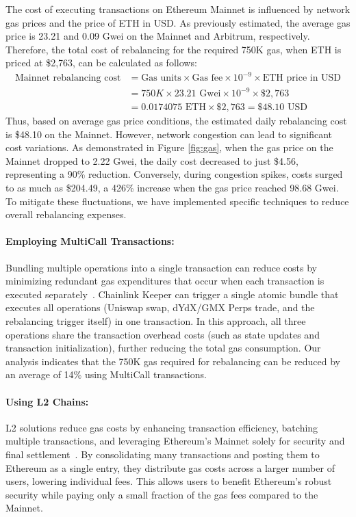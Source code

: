 The cost of executing transactions on Ethereum Mainnet is influenced by network gas prices and the price of ETH in USD. As previously estimated, the average gas price is 23.21 and 0.09 Gwei on the Mainnet and Arbitrum, respectively. Therefore, the total cost of rebalancing for the required 750K gas, when ETH is priced at \$2,763, can be calculated as follows:
\begin{equation*}\label{eq:cost}
	\begin{aligned}
		\text{Mainnet rebalancing cost} & = \text{Gas units} \times \text{Gas fee} \times 10^{-9} \times \text{ETH price in USD} \\
		& = 750K \times 23.21 \text{ Gwei} \times 10^{-9} \times \$2,763 \\
		& = 0.0174075 \text{ ETH} \times \$2,763 = \$48.10 \text{ USD}		
	\end{aligned}
\end{equation*}
Thus, based on average gas price conditions, the estimated daily rebalancing cost is \$48.10 on the Mainnet. However, network congestion can lead to significant cost variations. As demonstrated in Figure \ref{fig:gas}, when the gas price on the Mainnet dropped to 2.22 Gwei, the daily cost decreased to just \$4.56, representing a 90\% reduction. Conversely, during congestion spikes, costs surged to as much as \$204.49, a 426\% increase when the gas price reached 98.68 Gwei. To mitigate these fluctuations, we have implemented specific techniques to reduce overall rebalancing expenses.

\paragraph{Employing MultiCall Transactions:} 
Bundling multiple operations into a single transaction can reduce costs by minimizing redundant gas expenditures that occur when each transaction is executed separately~\cite{hughes2021multicall}. Chainlink Keeper can trigger a single atomic bundle that executes all operations (Uniswap swap, dYdX/GMX Perps trade, and the rebalancing trigger itself) in one transaction. In this approach, all three operations share the transaction overhead costs (such as state updates and transaction initialization), further reducing the total gas consumption. Our analysis indicates that the 750K gas required for rebalancing can be reduced by an average of 14\% using MultiCall transactions.

\paragraph{Using L2 Chains:} 
L2 solutions reduce gas costs by enhancing transaction efficiency, batching multiple transactions, and leveraging Ethereum's Mainnet solely for security and final settlement~\cite{Gangwal_2022}. By consolidating many transactions and posting them to Ethereum as a single entry, they distribute gas costs across a larger number of users, lowering individual fees. This allows users to benefit Ethereum's robust security while paying only a small fraction of the gas fees compared to the Mainnet. 

